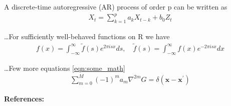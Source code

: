 \documentclass{article}
\begin{document}
A discrete-time autoregressive (AR) process of order p can be written as
\begin{gather}
    X_{t}=\sum_{k=1}^{p} a_{k} X_{t-k}+b_{0} Z_{t}
\end{gather}

\dots For sufficiently well-behaved functions on R we have
\begin{gather}
    f(x)=\int_{-\infty}^{\infty} \tilde{f}(s) e^{2 \pi i s x} d s, \quad \tilde{f}(s)=\int_{-\infty}^{\infty} f(x) e^{-2 \pi i s x} d x
\end{gather}

\dots Few more equations \ref{eqn:some_math}
\begin{gather}\label{eqn:some_math}
    \sum_{m=0}^{M}(-1)^{m} a_{m} \nabla^{2 m} G=\delta\left(\mathbf{x}-\mathbf{x}^{\prime}\right)
\end{gather}

\large \textbf{References:}

\printbibliography[heading=none]
\end{document}
